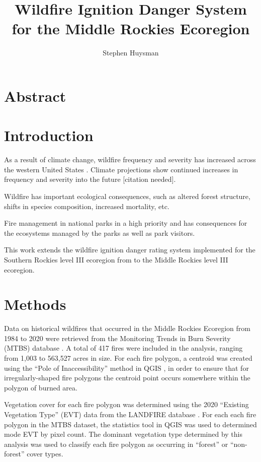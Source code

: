 \documentclass{article}
\author{Stephen Huysman}
\title{Wildfire Ignition Danger System for the Middle Rockies Ecoregion}
\begin{document}
\maketitle


\section{Abstract}

\section{Introduction}

As a result of climate change, wildfire frequency and severity has increased across the western United States \citep{rileyRelationshipLargeFire2013a}.  Climate projections show continued increases in frequency and severity into the future [citation needed].

Wildfire has important ecological consequences, such as altered forest structure, shifts in species composition, increased mortality, etc.

Fire management in national parks in a high priority and has consequences for the ecosystems managed by the parks as well as park visitors.

This work extends the wildfire ignition danger rating system implemented for the Southern Rockies level III ecoregion \citep{omernikEcoregionsConterminousUnited1987} from \citet{thomaWaterBalanceIndicator2020} to the Middle Rockies level III ecoregion.  

\section{Methods}

Data on historical wildfires that occurred in the Middle Rockies Ecoregion from 1984 to 2020 were retrieved from the Monitoring Trends in Burn Severity (MTBS) database \citep{eidenshinkProjectMonitoringTrends2007}.  A total of 417 fires were included in the analysis, ranging from 1,003 to 563,527 acres in size.  For each fire polygon, a centroid was created using the ``Pole of Inaccessibility'' method in QGIS \citep{QGIS_software}, in order to ensure that for irregularly-shaped fire polygons the centroid point occurs somewhere within the polygon of burned area.  

Vegetation cover for each fire polygon was determined using the 2020 ``Existing Vegetation Type'' (EVT) data from the LANDFIRE database \citep{rollinsLANDFIRENationallyConsistent2009}.  For each each fire polygon in the MTBS dataset, the statistics tool in QGIS was used to determined mode EVT by pixel count.  The dominant vegetation type determined by this analysis was used to classify each fire polygon as occurring in ``forest'' or ``non-forest'' cover types.  
\end{document}
